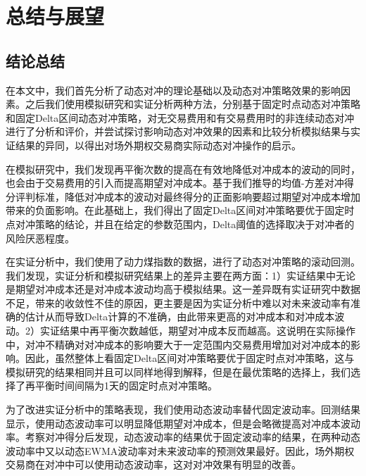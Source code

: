 
\chapter{总结与展望}
\label{chap:summary}

\section{结论总结}

在本文中，我们首先分析了动态对冲的理论基础以及动态对冲策略效果的影响因素。之后我们使用模拟研究和实证分析两种方法，分别基于固定时点动态对冲策略和固定Delta区间动态对冲策略，对无交易费用和有交易费用时的非连续动态对冲进行了分析和评价，并尝试探讨影响动态对冲效果的因素和比较分析模拟结果与实证结果的异同，以得出对场外期权交易商实际动态对冲操作的启示。

在模拟研究中，我们发现再平衡次数的提高在有效地降低对冲成本的波动的同时，也会由于交易费用的引入而提高期望对冲成本。基于我们推导的均值-方差对冲得分评判标准，降低对冲成本的波动对最终得分的正面影响要超过期望对冲成本增加带来的负面影响。在此基础上，我们得出了固定Delta区间对冲策略要优于固定时点对冲策略的结论，并且在给定的参数范围内，Delta阈值的选择取决于对冲者的风险厌恶程度。

在实证分析中，我们使用了动力煤指数的数据，进行了动态对冲策略的滚动回测。我们发现，实证分析和模拟研究结果上的差异主要在两方面：1）实证结果中无论是期望对冲成本还是对冲成本波动均高于模拟结果。这一差异既有实证研究中数据不足，带来的收敛性不佳的原因，更主要是因为实证分析中难以对未来波动率有准确的估计从而导致Delta计算的不准确，由此带来更高的对冲成本和对冲成本波动。2）实证结果中再平衡次数越低，期望对冲成本反而越高。这说明在实际操作中，对冲不精确对对冲成本的影响要大于一定范围内交易费用增加对对冲成本的影响。因此，虽然整体上看固定Delta区间对冲策略要优于固定时点对冲策略，这与模拟研究的结果相同并且可以同样地得到解释，但是在最优策略的选择上，我们选择了再平衡时间间隔为1天的固定时点对冲策略。

为了改进实证分析中的策略表现，我们使用动态波动率替代固定波动率。回测结果显示，使用动态波动率可以明显降低期望对冲成本，但是会略微提高对冲成本波动率。考察对冲得分后发现，动态波动率的结果优于固定波动率的结果，在两种动态波动率中又以动态EWMA波动率对未来波动率的预测效果最好。因此，场外期权交易商在对冲中可以使用动态波动率，这对对冲效果有明显的改善。

